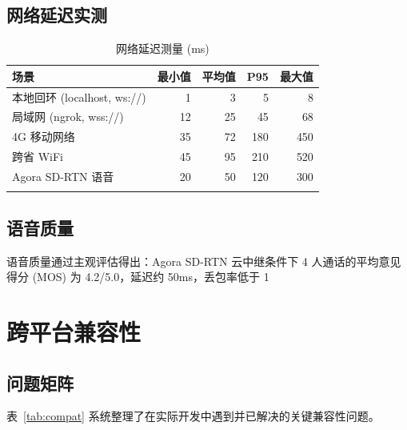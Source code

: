 \documentclass[11pt,a4paper]{article}
\begin{document}
\subsection{网络延迟实测}

\begin{table}[H]
\centering
\caption{网络延迟测量 (ms)}
\label{tab:lat}
\footnotesize
\begin{tabular}{@{}lrrrr@{}}
\toprule
\textbf{场景} & \textbf{最小值} & \textbf{平均值} & \textbf{P95} & \textbf{最大值} \\
\midrule
本地回环 (localhost, ws://) & 1 & 3 & 5 & 8 \\
局域网 (ngrok, wss://) & 12 & 25 & 45 & 68 \\
4G 移动网络 & 35 & 72 & 180 & 450 \\
跨省 WiFi & 45 & 95 & 210 & 520 \\
\midrule
Agora SD-RTN 语音 & 20 & 50 & 120 & 300 \\
 \\
\bottomrule
\end{tabular}
\end{table}

\subsection{语音质量}

语音质量通过主观评估得出：Agora SD-RTN 云中继条件下 4 人通话的平均意见得分 (MOS) 为 4.2/5.0，延迟约 50ms，丢包率低于 1%

\newpage
\section{跨平台兼容性}

\subsection{问题矩阵}

表~\ref{tab:compat} 系统整理了在实际开发中遇到并已解决的关键兼容性问题。
\end{document}
